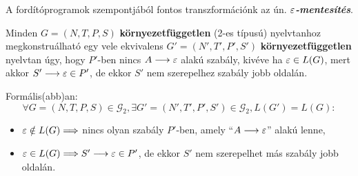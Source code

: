 A fordítóprogramok szempontjából fontos transzformációnk az ún. \textbf{\textit{$\varepsilon$-mentesítés}}.

\begin{tcolorbox}
	\begin{theorem}
		Minden $G = (N,T,P,S)$ \textbf{környezetfüggetlen} (2-es típusú) nyelvtanhoz megkonstruálható egy vele ekvivalens $G' = (N', T', P', S')$ \textbf{környezetfüggetlen} nyelvtan úgy, hogy $P'$-ben nincs $A \longrightarrow \varepsilon$ alakú szabály, kivéve ha $\varepsilon \in L(G)$, mert akkor $S' \longrightarrow \varepsilon \in P'$, de ekkor $S'$ nem szerepelhez szabály jobb oldalán.
		
		Formális(abb)an:
		\[ \forall G = (N, T, P, S) \in \mathcal{G}_2 , \exists G' = (N', T', P', S') \in \mathcal{G}_2, L(G') = L(G): \]
		\begin{itemize}
			\item $\varepsilon \notin L(G) \Longrightarrow$ nincs olyan szabály $P'$-ben, amely ``$A \longrightarrow \varepsilon$'' alakú lenne,
			\item $\varepsilon \in L(G) \Longrightarrow S' \longrightarrow \varepsilon \in P'$, de ekkor $S'$ nem szerepelhet más szabály jobb oldalán.
		\end{itemize}
	\end{theorem}
\end{tcolorbox}

~\\[-2.5em]

